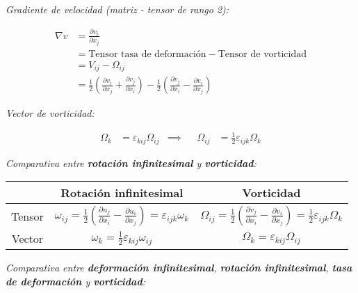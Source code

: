 \documentclass[a4paper,10pt,twoside,final,spanish]{article}
\begin{document}
\vspace{1em}

\textit{Gradiente de velocidad (matriz - tensor de rango 2):}

\begin{align*}
\nabla v &= \frac{\partial v_{i}}{\partial x_{j}} \\
&= \text{Tensor tasa de deformación}-\text{Tensor de vorticidad} \\
&= V_{ij}-\Omega_{ij} \\
&= \frac{1}{2}\left(\frac{\partial v_{i}}{\partial x_{j}}
+ \frac{\partial v_{j}}{\partial x_{i}}\right)
- \frac{1}{2}\left(\frac{\partial v_{j}}{\partial x_{i}}
- \frac{\partial v_{i}}{\partial x_{j}}\right)
\end{align*}

\vspace{1em}

\textit{Vector de vorticidad:}

\begin{align*}
\Omega_{k} &= \varepsilon_{kij}\Omega_{ij} & \implies &
&\Omega_{ij} &= \frac{1}{2}\varepsilon_{ijk}\Omega_{k}
\end{align*}

\vspace{1em}

\textit{Comparativa entre \textbf{rotación infinitesimal} y \textbf{vorticidad}:}

\begin{center}
\begin{tabular}{c | c | c} \toprule
       & Rotación infinitesimal & Vorticidad \\ \midrule
Tensor & $\displaystyle \omega_{ij}
=\frac{1}{2}\left(\frac{\partial u_{j}}{\partial x_{i}}
-\frac{\partial u_{i}}{\partial x_{j}}\right)
=\varepsilon_{ijk}\omega_{k}$ & $\displaystyle\Omega_{ij}
=\frac{1}{2}\left(\frac{\partial v_{j}}{\partial x_{i}}
- \frac{\partial v_{i}}{\partial x_{j}}\right)
=\frac{1}{2}\varepsilon_{ijk}\Omega_{k}$ \\
Vector & $\displaystyle\omega_{k}=\frac{1}{2}\varepsilon_{kij}\omega_{ij}$ & $\displaystyle\Omega_{k}=\varepsilon_{kij}\Omega_{ij}$ \\ \bottomrule
\end{tabular}
\end{center}

\vspace{1em}

\textit{Comparativa entre \textbf{deformación infinitesimal}, \textbf{rotación infinitesimal}, \textbf{tasa de deformación} y \textbf{vorticidad}:} \\
\end{document}
